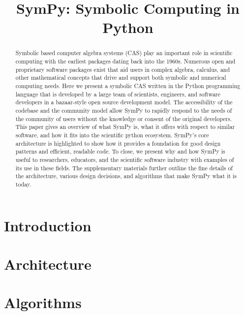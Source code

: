 \documentclass[review]{siamart0216}
\title{SymPy: Symbolic Computing in Python}
\begin{document}
\maketitle

\begin{abstract}
  Symbolic based computer algebra systems (CAS) play an important role in
  scientific computing with the earliest packages dating back into the 1960s.
  Numerous open and proprietary software packages exist that aid users in
  complex algebra, calculus, and other mathematical concepts that drive and
  support both symbolic and numerical computing needs.
  Here we present a symbolic CAS written in the Python programming language
  that is developed by a large team of scientists, engineers, and software
  developers in a bazaar-style open source development model.
  The accessibility of the codebase and the community model allow SymPy to
  rapidly respond to the needs of the community of users without the knowledge
  or consent of the original developers.
  This paper gives an overview of what SymPy is, what it offers with respect to
  similar software, and how it fits into the scientific python ecosystem.
  SymPy's core architecture is highlighted to show how it provides a
  foundation for good design patterns and efficient, readable code.
  To close, we present why and how SymPy is useful to researchers, educators,
  and the scientific software industry with examples of its use in these
  fields.
  The supplementary materials further outline the fine details of the
  architecture, various design decisions, and algorithms that make SymPy what
  it is today.
\end{abstract}

\section{Introduction}




\section{Architecture}



\section{Algorithms}
\end{document}
